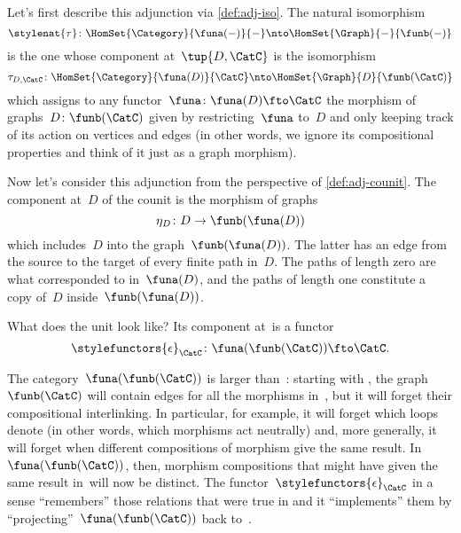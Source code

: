 Let's first describe this adjunction via \cref{def:adj-iso}.
The natural isomorphism
\begin{equation}
    \stylenat{\tau}\colon \HomSet{\Category}{\funa(-)}{-} \nto \HomSet{\Graph}{-}{\funb(-)}
\end{equation}
is the one whose component at~$\tup{D,\CatC}$ is the isomorphism
\begin{equation}
    \tau_{D,\CatC} \colon \HomSet{\Category}{\funa(D)}{\CatC} \nto \HomSet{\Graph}{D}{\funb(\CatC)}
\end{equation}
which assigns to any functor~$\funa\colon \funa(D) \fto \CatC$ the morphism of graphs~$D \colon \funb(\CatC)$ given by restricting~$\funa$ to~$D$ and only keeping track of its action on vertices and edges (in other words, we ignore its compositional properties and think of it just as a graph morphism).

Now let's consider this adjunction from the perspective of \cref{def:adj-counit}.
The component at~$D$ of the counit is the morphism of graphs
\begin{equation}
    \eta_D \colon D \to  \funb(\funa(D))
\end{equation}
which includes~$D$ into the graph~$\funb(\funa(D))$.
The latter has an edge from the source to the target of every finite path in~$D$.
The paths of length zero are what corresponded to    in~$\funa(D)$, and the paths of length one constitute a copy of~$D$ inside~$\funb(\funa(D))$.

What does the unit look like?
Its component at~\CatC is a functor
\begin{equation}
    \stylefunctors{\epsilon}_{\CatC} \colon \funa(\funb(\CatC)) \fto \CatC.
\end{equation}

The category~$\funa(\funb(\CatC))$ is larger than~\CatC: starting with \CatC, the graph~$\funb(\CatC)$ will contain edges for all the morphisms in~\CatC, but it will forget their compositional interlinking.
In particular, for example, it will forget which loops denote    (in other words, which morphisms act neutrally) and, more generally, it will forget when different compositions of morphism give the same result.
In~$\funa(\funb(\CatC))$, then, morphism compositions that might have given the same result in~\CatC will now be distinct.
The functor~$\stylefunctors{\epsilon}_{\CatC}$ in a sense ``remembers'' those relations that were true in \CatC and it ``implements'' them by ``projecting''~$\funa(\funb(\CatC))$ back to~\CatC.
